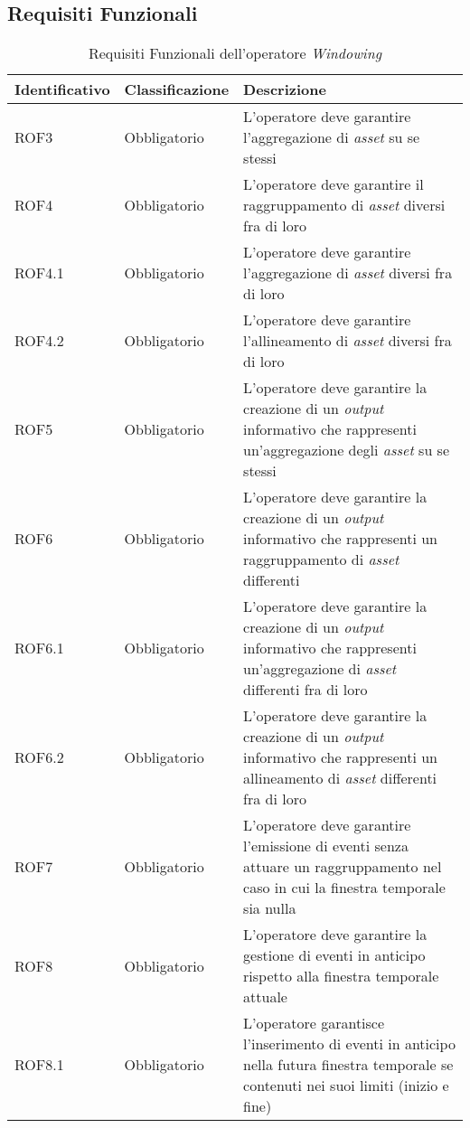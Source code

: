 \subsection{Requisiti Funzionali}
{
\centering
\begin{longtable}{L{3cm} L{3cm} L{7.5cm}}
\caption{Requisiti Funzionali dell'operatore \textit{Windowing}}\\
\textbf{Identificativo} &
\textbf{Classificazione}&
\textbf{Descrizione}\\
\endhead
\hline

ROF3 & Obbligatorio & L'operatore deve garantire l'aggregazione di \textit{asset} su se stessi\\
\hline
ROF4 & Obbligatorio & L'operatore deve garantire il raggruppamento di \textit{asset} diversi fra di loro\\
\hline
ROF4.1 & Obbligatorio & L'operatore deve garantire l'aggregazione di \textit{asset} diversi fra di loro\\
\hline
ROF4.2 & Obbligatorio & L'operatore deve garantire l'allineamento di \textit{asset} diversi fra di loro\\
\hline
ROF5 & Obbligatorio & L'operatore deve garantire la creazione di un \textit{output} informativo che rappresenti un'aggregazione degli \textit{asset} su se stessi\\
\hline
ROF6 & Obbligatorio & L'operatore deve garantire la creazione di un \textit{output} informativo che rappresenti un raggruppamento di \textit{asset} differenti\\
\hline
ROF6.1 & Obbligatorio & L'operatore deve garantire la creazione di un \textit{output} informativo che rappresenti un'aggregazione di \textit{asset} differenti fra di loro\\
\hline
ROF6.2 & Obbligatorio & L'operatore deve garantire la creazione di un \textit{output} informativo che rappresenti un allineamento di \textit{asset} differenti fra di loro\\
\hline
ROF7 & Obbligatorio & L'operatore deve garantire l'emissione di eventi senza attuare un raggruppamento nel caso in cui la finestra temporale sia nulla\\
\hline
ROF8 & Obbligatorio & L'operatore deve garantire la gestione di eventi in anticipo rispetto alla finestra temporale attuale\\
\hline
ROF8.1 & Obbligatorio & L'operatore garantisce l'inserimento di eventi in anticipo nella futura finestra temporale se contenuti nei suoi limiti (inizio e fine)\\

\end{longtable}}
